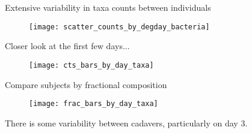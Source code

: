 \documentclass{beamer}
\begin{document}
\begin{frame}{Extensive variability in taxa counts between individuals}

\begin{center}
\begin{figure}
  \texttt{[image: scatter\_counts\_by\_degday\_bacteria]}
\end{figure}
\end{center}

\end{frame}


\begin{frame}{Closer look at the first few days...}

\begin{center}
\begin{figure}
  \texttt{[image: cts\_bars\_by\_day\_taxa]}
\end{figure}
\end{center}

\end{frame}


\begin{frame}{Compare subjects by fractional composition}

\begin{center}
\begin{figure}
  \texttt{[image: frac\_bars\_by\_day\_taxa]}
\end{figure}
\end{center}
{\scriptsize  There is some variability between cadavers, particularly on day 3.}

\end{frame}







\end{document}
